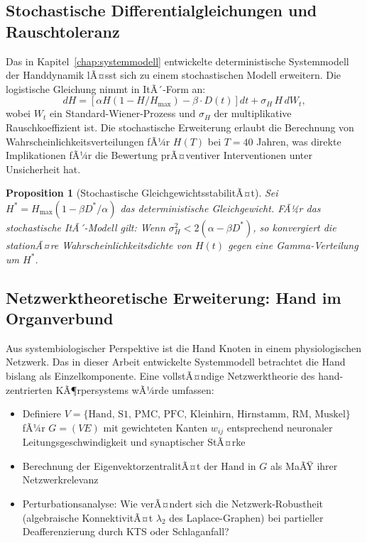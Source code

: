 ﻿\documentclass[12pt,a4paper]{report}
\theoremstyle{plain}
\newtheorem{proposition}[theorem]{Proposition}
\theoremstyle{definition}
\theoremstyle{remark}
\begin{document}
\subsection{Stochastische Differentialgleichungen und Rauschtoleranz}

Das in Kapitel~\ref{chap:systemmodell} entwickelte deterministische
Systemmodell der Handdynamik lÃ¤sst sich zu einem stochastischen
Modell erweitern. Die logistische Gleichung nimmt in ItÃ´-Form an:
\begin{equation}
  dH = \left[\alpha H(1 - H/H_{\max}) - \beta \cdot D(t)\right] dt
  + \sigma_H \, H \, dW_t,
\end{equation}
wobei $W_t$ ein Standard-Wiener-Prozess und $\sigma_H$ der
multiplikative Rauschkoeffizient ist. Die stochastische Erweiterung
erlaubt die Berechnung von Wahrscheinlichkeitsverteilungen fÃ¼r $H(T)$
bei $T = 40$ Jahren, was direkte Implikationen fÃ¼r die Bewertung
prÃ¤ventiver Interventionen unter Unsicherheit hat.

\begin{proposition}[Stochastische GleichgewichtsstabilitÃ¤t]
Sei $H^* = H_{\max}(1 - \beta D^*/\alpha)$ das deterministische
Gleichgewicht. FÃ¼r das stochastische ItÃ´-Modell gilt: Wenn
$\sigma_H^2 < 2(\alpha - \beta D^*)$, so konvergiert die
stationÃ¤re Wahrscheinlichkeitsdichte von $H(t)$ gegen eine
Gamma-Verteilung um $H^*$.
\end{proposition}

\subsection{Netzwerktheoretische Erweiterung: Hand im Organverbund}

Aus systembiologischer Perspektive ist die Hand Knoten in einem
physiologischen Netzwerk. Das in dieser Arbeit entwickelte Systemmodell
betrachtet die Hand bislang als Einzelkomponente. Eine vollstÃ¤ndige
Netzwerktheorie des hand-zentrierten KÃ¶rpersystems wÃ¼rde umfassen:

\begin{itemize}
\item Definiere $V = \{\text{Hand, S1, PMC, PFC, Kleinhirn, Hirnstamm, RM, Muskel}\}$ fÃ¼r $G = (V E)$ mit gewichteten Kanten $w_{ij}$ entsprechend neuronaler
  Leitungsgeschwindigkeit und synaptischer StÃ¤rke
\item Berechnung der EigenvektorzentralitÃ¤t der Hand in $G$ als
  MaÃŸ ihrer Netzwerkrelevanz
\item Perturbationsanalyse: Wie verÃ¤ndert sich die Netzwerk-Robustheit
  (algebraische KonnektivitÃ¤t $\lambda_2$ des Laplace-Graphen) bei
  partieller Deafferenzierung durch KTS oder Schlaganfall?
\end{itemize}
\end{document}
